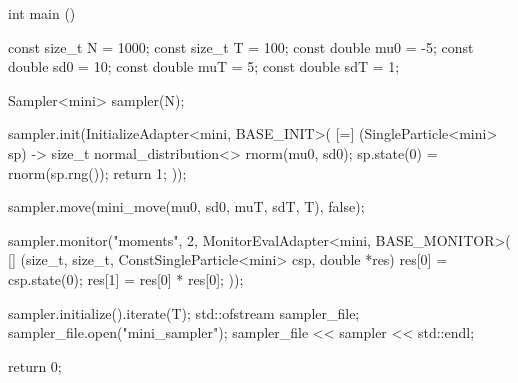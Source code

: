 \begin{cppcode}
int main ()
{
  const size_t N = 1000;
  const size_t T = 100;
  const double mu0 = -5;
  const double sd0 = 10;
  const double muT = 5;
  const double sdT = 1;

  Sampler<mini> sampler(N);

  sampler.init(InitializeAdapter<mini, BASE_INIT>(
        [=] (SingleParticle<mini> sp) -> size_t {
          normal_distribution<> rnorm(mu0, sd0);
          sp.state(0) = rnorm(sp.rng());
          return 1;
        }));

  sampler.move(mini_move(mu0, sd0, muT, sdT, T), false);

  sampler.monitor("moments", 2,
      MonitorEvalAdapter<mini, BASE_MONITOR>(
        [] (size_t, size_t,
            ConstSingleParticle<mini> csp, double *res) {
          res[0] = csp.state(0);
          res[1] = res[0] * res[0];
        }));

  sampler.initialize().iterate(T);
  std::ofstream sampler_file;
  sampler_file.open("mini_sampler");
  sampler_file << sampler << std::endl;

  return 0;
}
\end{cppcode}
